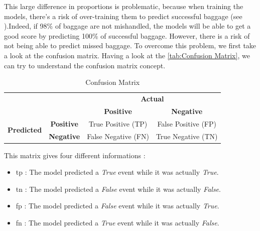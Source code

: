 \documentclass[12pt]{article}
\begin{document}
This large difference in proportions is problematic, because when training the models, there's a risk of over-training them to predict successful baggage (see \cite{ArtificialIntelligenceReview}).Indeed, if 98\% of baggage are not mishandled, the models will be able to get a good score by predicting 100\% of successful baggage. However, there is a risk of not being able to predict missed baggage. To overcome this problem, we first take a look at the confusion matrix. Having a look at the \autoref{tab:Confusion Matrix}, we can try to understand the confusion matrix concept. 
\begin{table}[htbp]
    \centering
    \captionsetup{justification=centering}
    \caption{Confusion Matrix}
    \label{tab:Confusion Matrix}
    \newcommand{\cellcolorpos}{\cellcolor{cyan!20}}
    \newcommand{\cellcolorneg}{\cellcolor{yellow!20}}
    \begin{tabular}{cc|c|c|}
        \cline{3-4}
        & & \multicolumn{2}{c|}{\textbf{Actual}} \\
        \cline{3-4}
        & & \textbf{Positive} & \textbf{Negative} \\
        \hline
        \multicolumn{1}{|c|}{\multirow{2}{*}{\textbf{Predicted}}}
        & \textbf{Positive} & \cellcolorpos True Positive (TP) & \cellcolorneg False Positive (FP) \\
        \cline{2-4}
        \multicolumn{1}{|c|}{}
        & \textbf{Negative} & \cellcolorneg False Negative (FN) & \cellcolorpos True Negative (TN) \\
        \hline
    \end{tabular}
\end{table}
\noindent This matrix gives four different informations : 
\begin{itemize}
\centering
    \item \acrshort{tp} : The model predicted a \textit{True} event while it was actually \textit{True}.
    \item \acrshort{tn} : The model predicted a \textit{False} event while it was actually \textit{False}.
    \item \acrshort{fp} : The model predicted a \textit{False} event while it was actually \textit{True}.
    \item \acrshort{fn} : The model predicted a \textit{True} event while it was actually \textit{False}.
\end{itemize}
\end{document}
